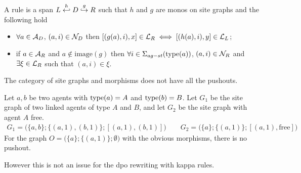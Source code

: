 \begin{definition}
  \label{def:rule_site}
  A rule is a span $L\overset{h}{\hookleftarrow} D \overset{g}{\hookrightarrow} R$ such that $h$ and $g$ are monos on site graphs and the following hold
  \begin{itemize}
  \item $\forall a\in\mathcal{A}_D$, $(a,i)\in\mathcal{N}_D$ then $[(g(a),i),x] \in\mathcal{L}_R \iff [(h(a),i),y] \in\mathcal{L}_L$;
  \item if $a\in\mathcal{A}_R$ and $a\notin\text{image}(g)$ then $\forall i\in\Sigma_{ag-st}(\operatorname{type}(a))$, $(a,i)\in\mathcal{N}_R$ and $\exists \xi\in \mathcal{L}_R$ such that $(a,i)\in \xi$.
  \end{itemize}
\end{definition}

The category of site graphs and morphisms does not have all the pushouts. %

\begin{example}
  Let $a,b$ be two agents with $\operatorname{type}(a)=A$ and $\operatorname{type}(b)=B$.
  Let $G_1$ be the site graph of two linked agents of type $A$ and $B$, and let $G_2$ be the site graph with agent $A$ free.
  \begin{align*}
    G_1 = \big(\{a,b\}; \{(a,1),(b,1)\}; [(a,1),(b,1)]\big)\qquad
    G_2 = \big(\{a\}; \{(a,1)\}; [(a,1),\text{free}] \big)
  \end{align*}
  For the graph $O=\big(\{a\};\{(a,1)\}; \emptyset\big)$ with the obvious morphisms, there is no pushout.
\end{example}

However this is not an issue for the dpo rewriting with kappa rules.

